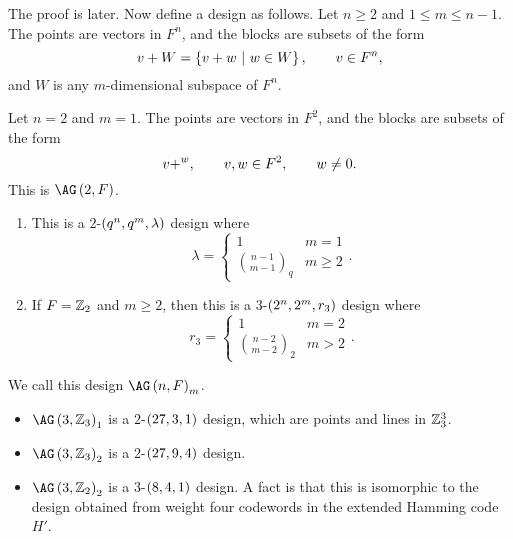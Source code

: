 The proof is later. Now define a design as follows. Let $ n \ge 2 $ and $ 1 \le m \le n - 1 $. The points are vectors in $ F^n $, and the blocks are subsets of the form
$$ v + W = \cbr{v + w \st w \in W}, \qquad v \in F^n, $$
and $ W $ is any $ m $-dimensional subspace of $ F^n $.

\begin{example*}
Let $ n = 2 $ and $ m = 1 $. The points are vectors in $ F^2 $, and the blocks are subsets of the form
$$ v + \sp w, \qquad v, w \in F^2, \qquad w \ne 0. $$
This is $ \AG\br{2, F} $.
\end{example*}

\begin{proposition}
\label{prop:3.17}
\hfill
\begin{enumerate}
\item This is a $ 2 $-$ \br{q^n, q^m, \lambda} $ design where
$$ \lambda =
\begin{cases}
1 & m = 1 \\
\binom{n - 1}{m - 1}_q & m \ge 2
\end{cases}.
$$
\item If $ F = \mathbb{Z}_2 $ and $ m \ge 2 $, then this is a $ 3 $-$ \br{2^n, 2^m, r_3} $ design where
$$ r_3 =
\begin{cases}
1 & m = 2 \\
\binom{n - 2}{m - 2}_2 & m > 2
\end{cases}.
$$
\end{enumerate}
\end{proposition}

We call this design $ \AG\br{n, F}_m $.

\pagebreak

\begin{example*}
\hfill
\begin{itemize}
\item $ \AG\br{3, \ZZ_3}_1 $ is a $ 2 $-$ \br{27, 3, 1} $ design, which are points and lines in $ \mathbb{Z}_3^3 $.
\item $ \AG\br{3, \ZZ_3}_2 $ is a $ 2 $-$ \br{27, 9, 4} $ design.
\item $ \AG\br{3, \ZZ_2}_2 $ is a $ 3 $-$ \br{8, 4, 1} $ design. A fact is that this is isomorphic to the design obtained from weight four codewords in the extended Hamming code $ H' $.
\end{itemize}
\end{example*}

